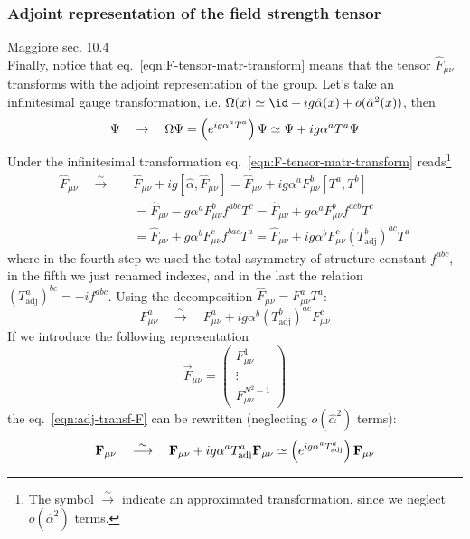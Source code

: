 \documentclass[TheoreticalPhy_ModB.tex]{subfiles}
\begin{document}
\subsubsection{Adjoint representation of the field strength tensor}
\textsf{Maggiore sec. 10.4}\\

Finally, notice that eq.~\eqref{eqn:F-tensor-matr-transform} means that the tensor $\hat F_{\mu\nu}$ transforms with the adjoint representation of the group. Let's take an infinitesimal gauge transformation, i.e. $\Omega(x)\simeq\id+ig\hat \alpha(x)+o(\hat \alpha^2(x))$, then
\begin{equation}\label{eqn:fund-rep-field-analogy}
\Psi\quad\to\quad\Omega\Psi=\left(e^{ig\alpha^aT^a}\right)\Psi\simeq\Psi+ig\alpha^aT^a\Psi
\end{equation}
Under the infinitesimal transformation eq.~\eqref{eqn:F-tensor-matr-transform} reads\footnote{The symbol $\overset{\sim}\longrightarrow$ indicate an approximated transformation, since we neglect $o(\hat \alpha^2)$ terms.}
\[\begin{split}
\hat F_{\mu\nu}\quad\overset{\sim}\longrightarrow\quad& \hat F_{\mu\nu}+ig[\hat\alpha,\hat F_{\mu\nu}]
=\hat F_{\mu\nu}+ig\alpha^aF_{\mu\nu}^b[T^a,T^b]\\
&=\hat F_{\mu\nu}-g\alpha^aF_{\mu\nu}^bf^{abc}T^c
=\hat F_{\mu\nu}+g\alpha^aF_{\mu\nu}^bf^{acb}T^c\\
&=\hat F_{\mu\nu}+g\alpha^bF_{\mu\nu}^cf^{bac}T^a
=\hat F_{\mu\nu}+ig\alpha^bF_{\mu\nu}^c(T^b_{\text{adj}})^{ac}T^a
\end{split}\]
where in the fourth step we used the total asymmetry of structure constant $f^{abc}$, in the fifth we just renamed indexes, and in the last the relation $(T^a_{\text{adj}})^{bc}=-if^{abc}$. Using the decomposition $\hat F_{\mu\nu}=F_{\mu\nu}^aT^a$:
\begin{equation}\label{eqn:adj-transf-F}
F_{\mu\nu}^a\quad\overset{\sim}\longrightarrow\quad F_{\mu\nu}^a+ig \alpha^b(T^b_{\text{adj}})^{ac}F_{\mu\nu}^c
\end{equation}
If we introduce the following representation
\[\vec F_{\mu\nu}=\begin{pmatrix}F_{\mu\nu}^1\\\vdots\\F_{\mu\nu}^{N^2-1}\end{pmatrix}\]
the eq.~\eqref{eqn:adj-transf-F} can be rewritten (neglecting $o(\hat\alpha^2)$ terms):
\begin{equation}\label{eqn:adj-rep-field-analogy}
\mathbf F_{\mu\nu}\quad\overset{\sim}\longrightarrow\quad 
\mathbf F_{\mu\nu}+ig\alpha^a T^a_{\text{adj}}\mathbf F_{\mu\nu}
\simeq \left(e^{ig\alpha^a T^a_{\text{adj}}}\right)\mathbf F_{\mu\nu}
\end{equation}
\end{document}
